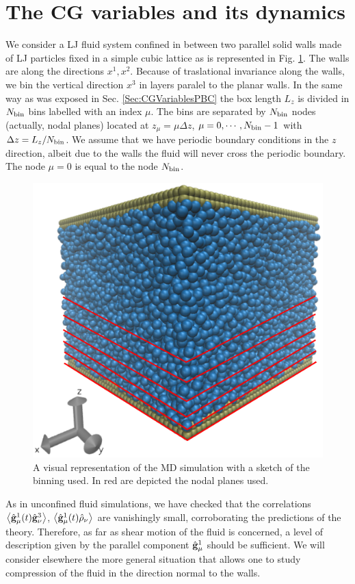 \documentclass[b5paper,openright,11pt]{book}
\newcommand{\llangle}{\left\langle}
\newcommand{\rrangle}{\right\rangle}
\begin{document}
\section{The CG variables and its dynamics}
We  consider a  LJ  fluid system  confined  in between  two
parallel solid walls made of LJ particles fixed in a simple
cubic lattice as is represented in Fig. \ref{fig:WallsBox}. The walls are  along the directions $x^1,x^2$.  Because
of  traslational  invariance along  the  walls,  we bin  the  vertical
direction $x^3$ in layers paralel to  the planar walls. In the same way as was exposed in Sec. \ref{Sec:CGVariablesPBC} the box length
$L_z$ is divided  in $N_{\rm bin}$ bins labelled with  an index $\mu$.
The bins are separated by $N_{\rm bin}$ nodes (actually, nodal planes)
located  at $z_\mu=\mu  \Delta z$,  $\mu=0,\cdots,N_{\rm bin}-1$  with
$\Delta z=L_z/N_{\rm bin}$.  We assume  that we have periodic boundary
conditions in the  $z$ direction, albeit due to the  walls the fluid
will never  cross the periodic boundary.   The node $\mu=0$ is equal to the node
$N_{\rm bin}$.   
\begin{figure}
    \centering
    \includegraphics[scale=0.3]{system_nodes_walls}
    \caption[Walls box]{A visual representation of the MD simulation with a sketch of the binning used. In red are depicted the nodal planes used.}
    \label{fig:WallsBox}
\end{figure}
As in unconfined fluid simulations, we have checked that the correlations   $\llangle   \hat{\bf
  g}^1_\mu(t)\hat{\bf     g}^3_\nu\rrangle$,    $\llangle     \hat{\bf
  g}^1_\mu(t)\hat{\rho}_\nu\rrangle$     are    vanishingly     small,
corroborating  the predictions  of the  theory. Therefore,  as far  as
shear motion of  the fluid is concerned, a level  of description given
by the  parallel component  $\hat{\bf g}^1_\mu$ should  be sufficient.
We will consider elsewhere the  more general situation that allows one
to  study compression  of the  fluid in  the direction  normal to  the
walls.
\end{document}
